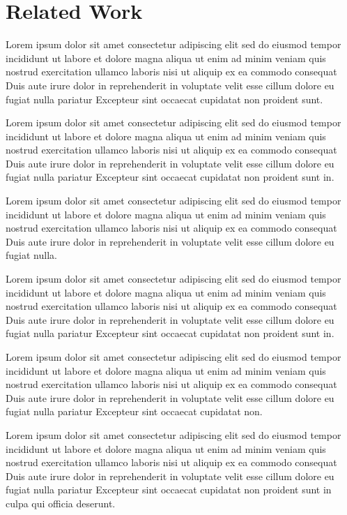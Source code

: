 \section{Related Work}

Lorem ipsum dolor sit amet consectetur adipiscing elit sed do eiusmod tempor incididunt ut labore et dolore magna aliqua ut enim ad minim veniam quis nostrud exercitation ullamco laboris nisi ut aliquip ex ea commodo consequat Duis aute irure dolor in reprehenderit in voluptate velit esse cillum dolore eu fugiat nulla pariatur Excepteur sint occaecat cupidatat non proident sunt. \cite{openflow-intro} \cite{openflow-spec}

Lorem ipsum dolor sit amet consectetur adipiscing elit sed do eiusmod tempor incididunt ut labore et dolore magna aliqua ut enim ad minim veniam quis nostrud exercitation ullamco laboris nisi ut aliquip ex ea commodo consequat Duis aute irure dolor in reprehenderit in voluptate velit esse cillum dolore eu fugiat nulla pariatur Excepteur sint occaecat cupidatat non proident sunt in. \cite{mininet}

Lorem ipsum dolor sit amet consectetur adipiscing elit sed do eiusmod tempor incididunt ut labore et dolore magna aliqua ut enim ad minim veniam quis nostrud exercitation ullamco laboris nisi ut aliquip ex ea commodo consequat Duis aute irure dolor in reprehenderit in voluptate velit esse cillum dolore eu fugiat nulla. \cite{ryu}

Lorem ipsum dolor sit amet consectetur adipiscing elit sed do eiusmod tempor incididunt ut labore et dolore magna aliqua ut enim ad minim veniam quis nostrud exercitation ullamco laboris nisi ut aliquip ex ea commodo consequat Duis aute irure dolor in reprehenderit in voluptate velit esse cillum dolore eu fugiat nulla pariatur Excepteur sint occaecat cupidatat non proident sunt in. \cite{opennetmon}

Lorem ipsum dolor sit amet consectetur adipiscing elit sed do eiusmod tempor incididunt ut labore et dolore magna aliqua ut enim ad minim veniam quis nostrud exercitation ullamco laboris nisi ut aliquip ex ea commodo consequat Duis aute irure dolor in reprehenderit in voluptate velit esse cillum dolore eu fugiat nulla pariatur Excepteur sint occaecat cupidatat non. \cite{fresco}

Lorem ipsum dolor sit amet consectetur adipiscing elit sed do eiusmod tempor incididunt ut labore et dolore magna aliqua ut enim ad minim veniam quis nostrud exercitation ullamco laboris nisi ut aliquip ex ea commodo consequat Duis aute irure dolor in reprehenderit in voluptate velit esse cillum dolore eu fugiat nulla pariatur Excepteur sint occaecat cupidatat non proident sunt in culpa qui officia deserunt.
